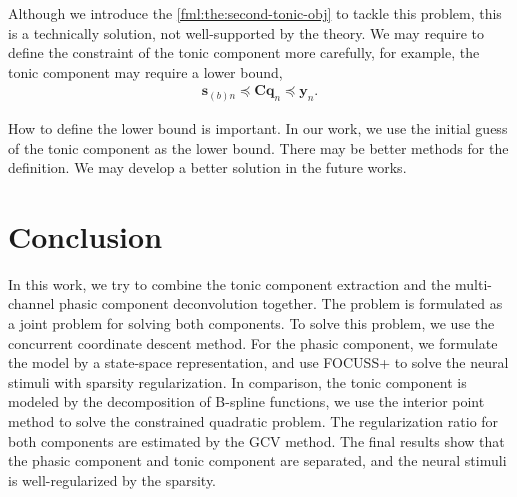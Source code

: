 \documentclass[10pt,conference]{ieeeconf}
\begin{document}
Although we introduce the \eqref{fml:the:second-tonic-obj} to tackle this problem, this is a technically solution, not well-supported by the theory. We may require to define the constraint of the tonic component more carefully, for example, the tonic component may require a lower bound,
\begin{align}
  \mathbf{s}_{(b)n} \preccurlyeq \mathbf{C}\mathbf{q}_n \preccurlyeq \mathbf{y}_n.
\end{align}

How to define the lower bound is important. In our work, we use the initial guess of the tonic component as the lower bound. There may be better methods for the definition. We may develop a better solution in the future works.

\section{Conclusion}

In this work, we try to combine the tonic component extraction and the multi-channel phasic component deconvolution together. The problem is formulated as a joint problem for solving both components. To solve this problem, we use the concurrent coordinate descent method. For the phasic component, we formulate the model by a state-space representation, and use FOCUSS+ to solve the neural stimuli with sparsity regularization. In comparison, the tonic component is modeled by the decomposition of B-spline functions, we use the interior point method to solve the constrained quadratic problem. The regularization ratio for both components are estimated by the GCV method. The final results show that the phasic component and tonic component are separated, and the neural stimuli is well-regularized by the sparsity.



\end{document}
